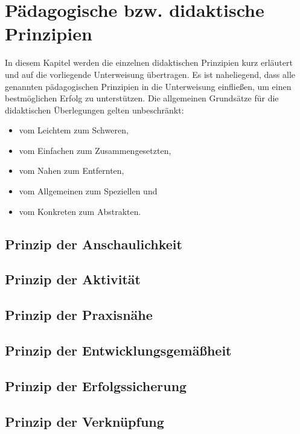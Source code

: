 \chapter{Pädagogische bzw. didaktische Prinzipien}
In diesem Kapitel werden die einzelnen didaktischen Prinzipien kurz erläutert und auf die vorliegende Unterweisung übertragen. Es ist naheliegend, dass alle genannten pädagogischen Prinzipien in die Unterweisung einfließen, um einen bestmöglichen Erfolg zu unterstützen. Die allgemeinen Grundsätze für die didaktischen Überlegungen gelten unbeschränkt: 

\begin{itemize}
	\item vom Leichtem zum Schweren,
	\item vom Einfachen zum Zusammengesetzten, 
	\item vom Nahen zum Entfernten, 
	\item vom Allgemeinen zum Speziellen und 
	\item vom Konkreten zum Abstrakten.
	
\end{itemize}

\section{Prinzip der Anschaulichkeit}

\section{Prinzip der Aktivität}

\section{Prinzip der Praxisnähe}

\section{Prinzip der Entwicklungsgemäßheit}

\section{Prinzip der Erfolgssicherung}

\section{Prinzip der Verknüpfung}
